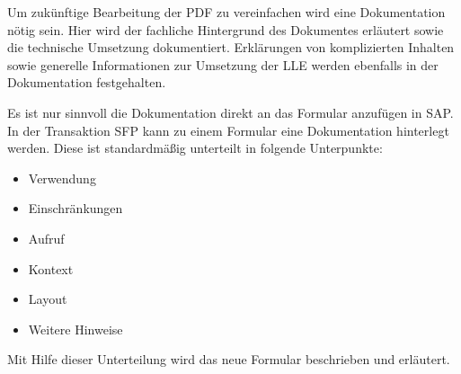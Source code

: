 Um zukünftige Bearbeitung der PDF zu vereinfachen wird eine Dokumentation nötig sein. Hier wird der fachliche Hintergrund des Dokumentes erläutert sowie die technische Umsetzung dokumentiert. Erklärungen von komplizierten Inhalten sowie generelle Informationen zur Umsetzung der \ac{LLE} werden ebenfalls in der Dokumentation festgehalten. 

Es ist nur sinnvoll die Dokumentation direkt an das Formular anzufügen in SAP. In der Transaktion SFP kann zu einem Formular eine Dokumentation hinterlegt werden. Diese ist standardmäßig unterteilt in folgende Unterpunkte:

\begin{itemize}
	\item Verwendung
	\item Einschränkungen
	\item Aufruf
	\item Kontext
	\item Layout
	\item Weitere Hinweise
	
\end{itemize}

Mit Hilfe dieser Unterteilung wird das neue Formular beschrieben und erläutert.